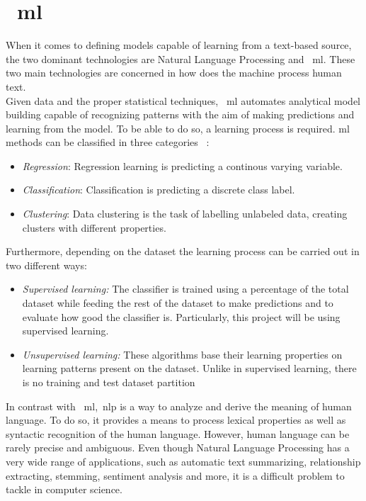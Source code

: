 \section{~\acl{ml}}
When it comes to defining models capable of learning from a text-based source, the two dominant technologies are Natural Language Processing and ~\ac{ml}. These two main technologies are concerned in how does the machine process human text. \\
Given data and the proper statistical techniques, ~\ac{ml} automates analytical model building capable of recognizing patterns with the aim of making predictions and learning from the model. To be able to do so, a learning process is required. \ac{ml} methods can be classified in three categories ~\cite{dataclust}:
\begin{itemize}
	\item \textit{Regression}: Regression learning is predicting a continous varying variable.
	\item \textit{Classification}: Classification is predicting a discrete class label.
	\item \textit{Clustering}: Data clustering is the task of labelling unlabeled data, creating clusters with different properties. 
\end{itemize} 

Furthermore, depending on the dataset the learning process can be carried out in two different ways:
\begin{itemize}
	\item \textit{Supervised learning:} \label{ml:super}The classifier is trained using a percentage of the total dataset while feeding the rest of the dataset to make predictions and to evaluate how good the classifier is. Particularly, this project will be using supervised learning.
	
	\item \textit{Unsupervised learning:} These algorithms base their learning properties on learning patterns present on the dataset. Unlike in supervised learning, there is no training and test dataset partition
\end{itemize}

In contrast with ~\ac{ml},~\ac{nlp} is a way to analyze and derive the meaning of human language. To do so, it provides a means to process lexical properties as well as syntactic recognition of the human language. However, human language can be rarely precise and ambiguous. Even though Natural Language Processing has a very wide range of applications, such as automatic text summarizing, relationship extracting, stemming, sentiment analysis and more, it is a difficult problem to tackle in computer science.

